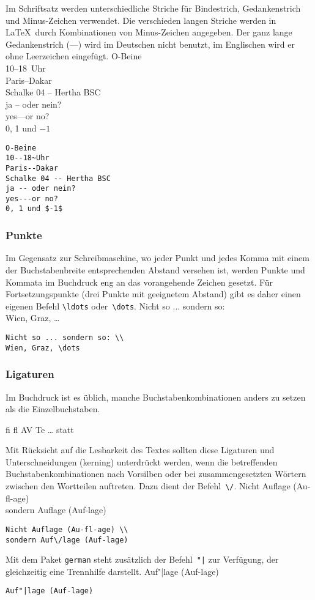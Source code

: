 Im Schriftsatz werden unterschiedliche Striche für Bindestrich,
Gedankenstrich und Minus-Zeichen verwendet.
Die verschieden langen Striche werden in \LaTeX\ durch
Kombinationen von Minus-Zeichen angegeben. Der ganz lange
Gedankenstrich (\mbox{---}) wird im Deutschen nicht benutzt, im
Englischen wird er ohne Leerzeichen eingefügt.
\exa
O-Beine \\
10--18~Uhr \\
Paris--Dakar \\
Schalke 04 -- Hertha BSC \\
ja -- oder nein? \\
yes---or no? \\
0, 1 und $-1$
\exb
\begin{verbatim}
O-Beine
10--18~Uhr
Paris--Dakar
Schalke 04 -- Hertha BSC
ja -- oder nein?
yes---or no?
0, 1 und $-1$
\end{verbatim}
\exc
 
\subsubsection{Punkte}
 
Im Gegensatz zur Schreibmaschine, wo jeder Punkt und jedes Komma
mit einem der Buchstabenbreite entsprechenden Abstand versehen
ist, werden Punkte und Kommata im Buchdruck eng an das
vorangehende Zeichen gesetzt. Für Fortsetzungspunkte (drei
Punkte mit geeignetem Abstand) gibt es daher einen eigenen Befehl
\verb|\ldots| oder~\verb|\dots|.
\exa
Nicht so ... sondern so: \\
Wien, Graz, \dots
\exb
\begin{verbatim}
Nicht so ... sondern so: \\
Wien, Graz, \dots
\end{verbatim}
\exc
 
\subsubsection{Ligaturen}
 
Im Buchdruck ist es üblich, manche Buchstabenkombinationen
anders zu setzen als die Einzelbuchstaben.
\begin{beispiel}
{\large fi fl AV Te \dots}\quad
statt
\end{beispiel}
Mit Rücksicht auf die Lesbarkeit des Textes sollten
diese  Ligaturen und Unterschneidungen (kerning) 
unterdrückt werden, wenn die betreffenden Buchstabenkombinationen 
nach Vorsilben oder bei zusammengesetzten Wörtern zwischen den
Wortteilen auftreten.  Dazu dient der Befehl~\verb|\/|.
\exa
Nicht Auflage (Au-fl-age) \\
sondern Auf\/lage (Auf-lage)
\exb
\begin{verbatim}
Nicht Auflage (Au-fl-age) \\
sondern Auf\/lage (Auf-lage)
\end{verbatim}
\exc
Mit dem Paket \texttt{german} steht zusätzlich der
Befehl~\verb:"|: zur Verfügung, der gleichzeitig eine
Trennhilfe darstellt.
\exa
Auf"|lage (Auf-lage)
\exb
\begin{verbatim}
Auf"|lage (Auf-lage)
\end{verbatim}
\exc

